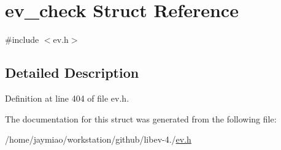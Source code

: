 \hypertarget{structev__check}{\section{ev\-\_\-check \-Struct \-Reference}
\label{structev__check}
}


{\ttfamily \#include $<$ev.\-h$>$}



\subsection{\-Detailed \-Description}


\-Definition at line 404 of file ev.\-h.



\-The documentation for this struct was generated from the following file\-:\begin{DoxyCompactItemize}
\item 
/home/jaymiao/workstation/github/libev-\/4./\hyperlink{ev_8h}{ev.\-h}\end{DoxyCompactItemize}
